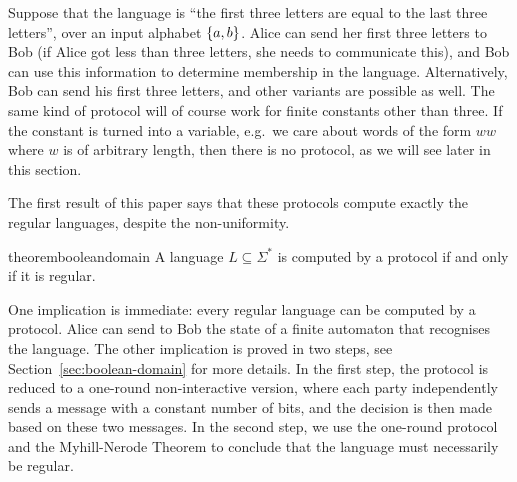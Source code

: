 \begin{myexample}
    \label{ex:three-letters}
Suppose that the language is ``the first three letters are equal to the last three letters'', over an input alphabet $\{a,b\}$.
Alice can send her  first three letters to Bob (if Alice got less than three letters, she needs to communicate this), and Bob can use this information to determine membership in the language. Alternatively, Bob can send his first three letters, and other variants are possible as well. The same kind of  protocol will of course work for finite constants other than three. If the constant is turned into a variable, e.g.~we care about words of the form $ww$ where $w$ is of arbitrary length, then there is no  protocol, as we will see later in this section. 
\end{myexample}

The first result of this paper  says that these protocols compute exactly the regular languages, despite the non-uniformity.
\begin{restatable}{theorem}{booleandomain}
     \label{thm:boolean-domain}
  A language $L \subseteq \Sigma^*$ is computed by a protocol if and only if it is regular.
\end{restatable}
One implication is immediate: every regular language can be computed by a protocol.  Alice can send to Bob the state of a finite automaton that recognises the language. The other implication is proved in two steps, see Section~\ref{sec:boolean-domain} for more details. In the first step, the protocol is reduced to a one-round non-interactive version, where each party independently sends a message with a constant number of bits, and the decision is then made based on these two messages. In the second step, we use the one-round protocol and the Myhill-Nerode Theorem to conclude that the language must necessarily be regular. 



